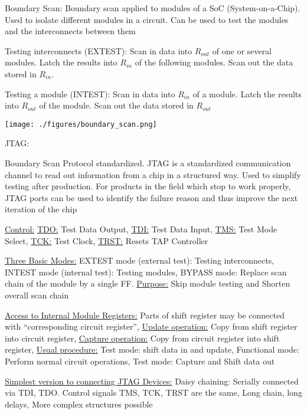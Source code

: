 \documentclass[landscape, a4paper]{article}
\begin{document}
\begin{minipage}[t]{0.2\linewidth}
\begin{betterlist}
		\item \alert{Boundary Scan:} Boundary scan applied to modules of a SoC (System-on-a-Chip). Used to isolate different modules in a circuit. Can be used to test the modules and the interconnects between them
		\begin{betterlist}
			\item Testing interconnects (EXTEST): Scan in data into $R_{out}$ of one or several modules. Latch the results into $R_{in}$ of the following modules. Scan out the data stored in $R_{in}$.
			\item Testing a module (INTEST): Scan in data into $R_{in}$ of a module. Latch the results into $R_{out}$ of the module. Scan out the data stored in $R_{out}$
		\end{betterlist}

		\texttt{[image: ./figures/boundary\_scan.png]}
		\item \alert{JTAG:}
		\begin{betterlist}
			\item Boundary Scan Protocol standardized. JTAG is a standardized communication channel to read out information from a chip in a structured way. Used to simplify testing after production. For products in the field which stop to work properly, JTAG ports can be used to identify the failure reason and thus improve the next iteration of the chip
			\item \underline{Control:} \underline{TDO:} Test Data Output, \underline{TDI:} Test Data Input, \underline{TMS:} Test Mode Select, \underline{TCK:} Test Clock, \underline{TRST:} Resets TAP Controller
			\item \underline{Three Basic Modes:} \alert{EXTEST mode (external test):} Testing interconnects, \alert{INTEST mode (internal test):} Testing modules, \alert{BYPASS mode:} Replace scan chain of the module by a single FF. \underline{Purpose:} Skip module testing and Shorten overall scan chain
			\item \underline{Access to Internal Module Registers:} Parts of shift register may be connected with \enquote{corresponding circuit register}, \underline{Update operation:} Copy from shift register into circuit register, \underline{Capture operation:} Copy from circuit register into shift register, \underline{Usual procedure:} \alert{Test mode:} shift data in and update, \alert{Functional mode:} Perform normal circuit operations, \alert{Test mode:} Capture and Shift data out
			\item \underline{Simplest version to connecting JTAG Devices:} \alert{Daisy chaining:} Serially connected via TDI, TDO. Control signals TMS, TCK, TRST are the same, Long chain, long delays, More complex structures possible
		\end{betterlist}
	\end{betterlist}
\end{minipage}
\end{document}
